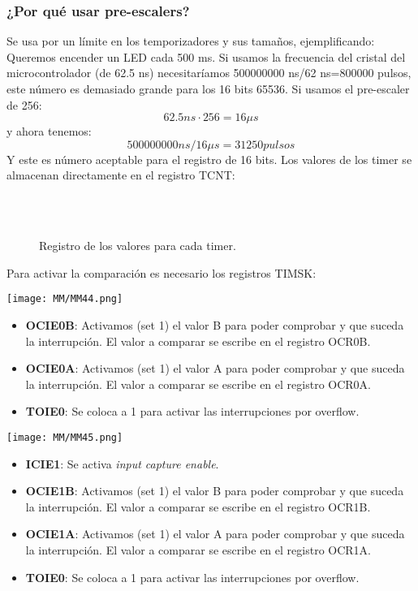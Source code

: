 \documentclass[
	12pt, %
	fleqn, %
	a4paper, %
	oneside, %
]{LegrandOrangeBook}
\begin{document}
\subsubsection*{¿Por qué usar pre-escalers?}
Se usa por un límite en los temporizadores y sus tamaños, ejemplificando: Queremos encender un LED cada 500 ms. Si usamos la frecuencia del cristal del microcontrolador (de 62.5 ns) necesitaríamos 500000000 ns/62 ns=800000 pulsos, este número es demasiado grande para los 16 bits 65536. Si usamos el pre-escaler de 256:
\begin{displaymath}
62.5 ns\cdot 256=16\mu s
\end{displaymath}
y ahora tenemos:
\begin{displaymath}
500000000 ns/16\mu s=31250 pulsos
\end{displaymath}
Y este es número aceptable para el registro de 16 bits. Los valores de los timer se almacenan directamente en el registro TCNT:
\begin{figure}[H]
\centering
{}\\
\\
\caption{Registro de los valores para cada timer. }
\end{figure}
Para activar la comparación es necesario los registros TIMSK:\\
\begin{center}
\texttt{[image: MM/MM44.png]}
\end{center}
\begin{itemize}
\item \textbf{OCIE0B}: Activamos (set 1) el valor B para poder comprobar y que suceda la interrupción. El valor a comparar se escribe en el registro OCR0B.
\item \textbf{OCIE0A}: Activamos (set 1) el valor A para poder comprobar y que suceda la interrupción. El valor a comparar se escribe en el registro OCR0A.
\item \textbf{TOIE0}: Se coloca a 1 para activar las interrupciones por overflow.
\end{itemize}
\begin{center}
\texttt{[image: MM/MM45.png]}
\end{center}
\begin{itemize}
\item \textbf{ICIE1}: Se activa \textit{input capture enable}.
\item \textbf{OCIE1B}: Activamos (set 1) el valor B para poder comprobar y que suceda la interrupción. El valor a comparar se escribe en el registro OCR1B.
\item \textbf{OCIE1A}: Activamos (set 1) el valor A para poder comprobar y que suceda la interrupción. El valor a comparar se escribe en el registro OCR1A.
\item \textbf{TOIE0}: Se coloca a 1 para activar las interrupciones por overflow.
\end{itemize}
\end{document}
